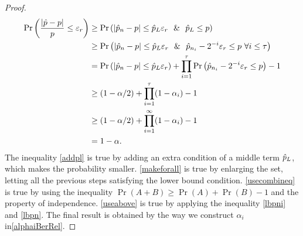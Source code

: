 \documentclass{iitthesis}
\theoremstyle{definition}
\begin{document}
\begin{proof}
\begin{align}
 \Pr \left ( \frac{\abs{\hp - p}}{p} \leq \varepsilon_r\right ) & \geq \Pr \left ( \abs{\hp_n - p} \leq \hp_L\varepsilon_r \ \ \& \ \   \hp_L \leq p \right ) \label{addpl}\\&
 \geq \Pr \left( \abs{\hp_n - p} \leq \hp_L \varepsilon_r \ \  \& \ \  \hp_{n_i} - 2^{-i}\varepsilon_r \leq p\  \forall i  \leq \tau \right) \label{makeforall}\\&
  = \Pr\left ( \abs{\hp_n - p} \leq \hp_L \varepsilon_r \right)+ \prod_{i = 1}^\tau \Pr \left(\hp_{n_i} - 2^{-i}\varepsilon_r  \leq p \right)-1\label{usecombineq} \\&
\geq (1-\alpha/2)+\prod_{i=1}^\tau(1-\alpha_i)-1 \label{useabove} \\&
\geq (1-\alpha/2)+\prod_{i=1}^\infty (1-\alpha_i)-1  \\&
 = 1-\alpha \label{constructalphai}.
\end{align}
The inequality \eqref{addpl} is true by adding an extra condition of a middle term  $\hat{p}_L$, which makes the probability smaller. \eqref{makeforall} is true by enlarging the set, letting all the previous steps satisfying the lower bound condition. \eqref{usecombineq} is true by using the inequality $\Pr(A+B)\geq\Pr(A)+\Pr(B)-1$ and the property of independence. \eqref{useabove} is true by applying the inequality \eqref{lbpni} and \eqref{lbpn}. The final result is obtained by the way we construct $\alpha_i$ in\eqref{alphaiBerRel}.
\end{proof}
\end{document}

